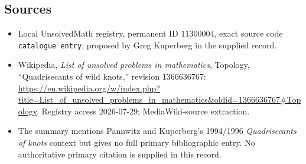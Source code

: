\documentclass[11pt]{article}
\begin{document}
\subsection{Sources}
\begin{itemize}
\item Local UnsolvedMath registry, permanent ID \(11300004\), exact source code \texttt{catalogue entry}; proposed by Greg Kuperberg in the supplied record.
\item Wikipedia, \emph{List of unsolved problems in mathematics}, Topology, ``Quadrisecants of wild knots,'' revision 1366636767: \url{https://en.wikipedia.org/w/index.php?title=List_of_unsolved_problems_in_mathematics&oldid=1366636767#Topology}. Registry access 2026-07-29; MediaWiki-source extraction.
\item The summary mentions Pannwitz and Kuperberg's 1994/1996 \emph{Quadrisecants of knots} context but gives no full primary bibliographic entry. No authoritative primary citation is supplied in this record.
\end{itemize}
\end{document}

